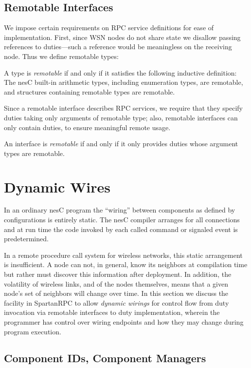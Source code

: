 \subsection{Remotable Interfaces}
\label{section-remotable}

We impose certain requirements on RPC service definitions for ease of
implementation. First, since WSN nodes do not share state we disallow
passing references to duties---such a reference would be meaningless on
the receiving node. Thus we define remotable types:
\begin{definition}A type is \emph{remotable} if and only if it satisfies
  the following inductive definition: The nesC built-in arithmetic
  types, including enumeration types, are remotable, and structures
  containing remotable types are remotable.
\end{definition}
Since a remotable interface describes RPC services, we require that they
specify duties taking only arguments of remotable type; also, remotable
interfaces can only contain duties, to ensure meaningful remote usage.
\begin{definition}
  An interface is \emph{remotable} if and only if it only provides
  duties whose argument types are remotable.
\end{definition}

\section{Dynamic Wires}
\label{section-dynamic-wires}

In an ordinary nesC program the ``wiring'' between components as defined
by configurations is entirely static. The nesC compiler arranges for all
connections and at run time the code invoked by each called command or
signaled event is predetermined.

In a remote procedure call system for wireless networks, this static
arrangement is insufficient. A node can not, in general, know its
neighbors at compilation time but rather must discover this information
after deployment. In addition, the volatility of wireless links, and of
the nodes themselves, means that a given node's set of neighbors will
change over time. In this section we discuss the facility in SpartanRPC
to allow \emph{dynamic wirings} for control flow from duty invocation
via remotable interfaces to duty implementation, wherein the programmer
has control over wiring endpoints and how they may change during program
execution.

\subsection{Component IDs, Component Managers}
\label{section-componentmanager}

